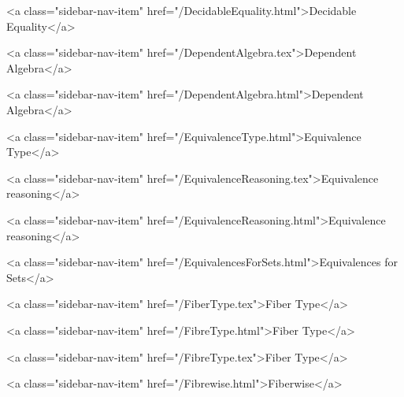       
        
          <a class="sidebar-nav-item" href="/DecidableEquality.html">Decidable Equality</a>
        
      
    
      
        
          <a class="sidebar-nav-item" href="/DependentAlgebra.tex">Dependent Algebra</a>
        
      
    
      
        
          <a class="sidebar-nav-item" href="/DependentAlgebra.html">Dependent Algebra</a>
        
      
    
      
        
          <a class="sidebar-nav-item" href="/EquivalenceType.html">Equivalence Type</a>
        
      
    
      
        
          <a class="sidebar-nav-item" href="/EquivalenceReasoning.tex">Equivalence reasoning</a>
        
      
    
      
        
          <a class="sidebar-nav-item" href="/EquivalenceReasoning.html">Equivalence reasoning</a>
        
      
    
      
        
          <a class="sidebar-nav-item" href="/EquivalencesForSets.html">Equivalences for Sets</a>
        
      
    
      
        
          <a class="sidebar-nav-item" href="/FiberType.tex">Fiber Type</a>
        
      
    
      
        
          <a class="sidebar-nav-item" href="/FibreType.html">Fiber Type</a>
        
      
    
      
        
          <a class="sidebar-nav-item" href="/FibreType.tex">Fiber Type</a>
        
      
    
      
        
          <a class="sidebar-nav-item" href="/Fibrewise.html">Fiberwise</a>
        
